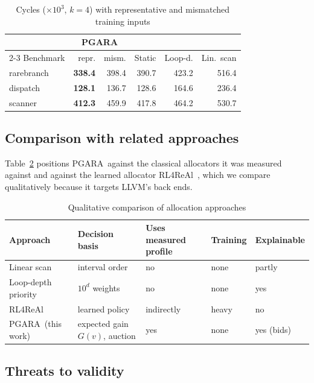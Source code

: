 \documentclass[conference]{IEEEtran}
\newcommand{\MG}{PGARA}
\begin{document}
\begin{table}[t]
\centering
\caption{Cycles ($\times10^3$, $k=4$) with representative and
mismatched training inputs}
\label{tab:sens}
\footnotesize
\setlength{\tabcolsep}{3.5pt}
\begin{tabular}{@{}lrrrrr@{}}
\toprule
& \multicolumn{2}{c}{\MG} & & & \\
\cmidrule(lr){2-3}
Benchmark & repr. & mism. & Static & Loop-d. & Lin.\ scan \\
\midrule
rarebranch & \textbf{338.4} & 398.4 & 390.7 & 423.2 & 516.4 \\
dispatch & \textbf{128.1} & 136.7 & 128.6 & 164.6 & 236.4 \\
scanner & \textbf{412.3} & 459.9 & 417.8 & 464.2 & 530.7 \\
\bottomrule
\end{tabular}
\end{table}

\subsection{Comparison with related approaches}

Table~\ref{tab:compare} positions \MG\ against the classical
allocators it was measured against and against the learned allocator
RL4ReAl~\cite{venkatakeerthy2023rl4real}, which we compare
qualitatively because it targets LLVM's back ends.

\begin{table}[t]
\centering
\caption{Qualitative comparison of allocation approaches}
\label{tab:compare}
\footnotesize
\setlength{\tabcolsep}{2.5pt}
\begin{tabular}{@{}p{17mm}p{18mm}p{14mm}p{12mm}p{12mm}@{}}
\toprule
Approach & Decision basis & Uses measured profile & Training & Explainable \\
\midrule
Linear scan~\cite{poletto1999} & interval order & no & none & partly \\
Loop-depth priority~\cite{chow1990} & $10^{d}$ weights & no & none & yes \\
RL4ReAl~\cite{venkatakeerthy2023rl4real} & learned policy & indirectly & heavy & no \\
\MG\ (this work) & expected gain $G(v)$, auction & yes & none & yes (bids) \\
\bottomrule
\end{tabular}
\end{table}

\subsection{Threats to validity}
\end{document}
